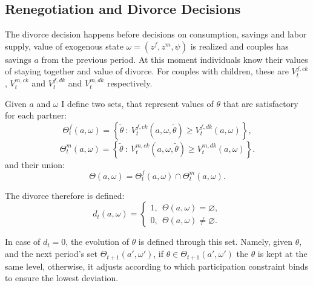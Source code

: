 \documentclass[12pt,letter]{article}
\DeclareMathOperator*{\argmin}{\mathrm{argmin}}
\begin{document}
\subsection{Renegotiation and Divorce Decisions\label{divorcedecision}}

The divorce decision happens before decisions on consumption, savings and labor supply, value of exogenous state $\omega = (z^f,z^m,\psi)$ is realized and couples has savings $a$ from the previous period.  At this moment individuals know their values of staying together and value of divorce. For couples with children, these are $V_t^{f,ck}$, $V_t^{m,ck}$ and $V_t^{f,dk}$ and $V_t^{m,dk}$ respectively. 

Given $a$ and $\omega$ I define two sets, that represent values of $\theta$ that are satisfactory for each partner:
\[\Theta^f_t(a,\omega) = \left\{\tilde \theta \ : \ V_t^{f,ck}(a,\omega,\tilde\theta) \geq V_t^{f,dk}(a,\omega)\right\},\]
\[\Theta^m_t(a,\omega) = \left\{\tilde \theta \ : \ V_t^{m,ck}(a,\omega,\tilde\theta) \geq V_t^{m,dk}(a,\omega)\right\}.\]
and their union:
\[\Theta(a,\omega) = \Theta^f_t(a,\omega) \cap \Theta^m_t(a,\omega).\]

The divorce therefore is defined:
\begin{equation}
d_t(a,\omega) = \begin{cases} 1, \ \ \Theta(a,\omega) = \varnothing,\\
 0, \ \ \Theta(a,\omega) \neq \varnothing.
 \end{cases}
\end{equation}

In case of $d_t = 0$, the evolution of $\theta$ is defined through this set. Namely, given $\theta$, and the next period's set $\Theta_{t+1}(a',\omega')$, if $\theta \in \Theta_{t+1}(a',\omega')$ the $\theta$ is kept at the same level, otherwise, it adjusts according to which participation constraint binds to ensure the lowest deviation.%
\end{document}
